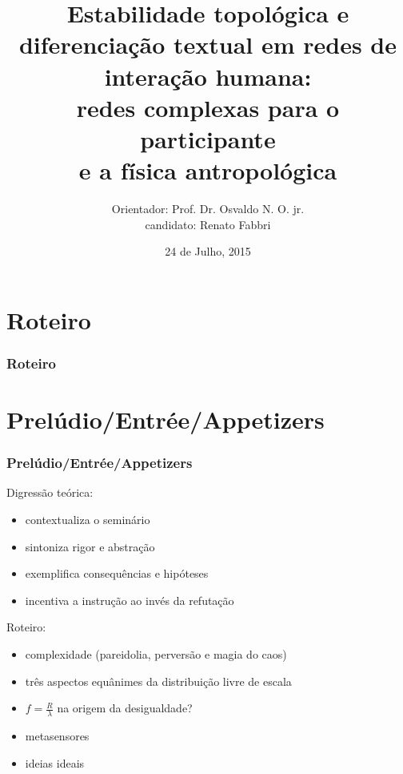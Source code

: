 \documentclass[10pt]{beamer}
\begin{document}
\title {\bfseries{\sc\large Estabilidade topológica e diferenciação textual
em redes de interação humana: \\
redes complexas para o participante\\
e a física antropológica
}}


\author[Renato Fabbri]{\small {Orientador: Prof. Dr. Osvaldo N. O. jr.\\
		candidato: Renato Fabbri\\
}}

\date{\small 24 de Julho, 2015} 
\begin{frame}
\titlepage
\end{frame}
\section*{Roteiro}
\begin{frame}
\frametitle{Roteiro}  
\tableofcontents
\end{frame}

\section{Prelúdio/Entrée/Appetizers}
\begin{frame}
\frametitle{Prelúdio/Entrée/Appetizers}


Digressão teórica:
\begin{itemize}
	\item contextualiza o seminário
	\item sintoniza rigor e abstração
	\item exemplifica consequências e hipóteses
	\item incentiva a instrução ao invés da refutação
\end{itemize}

\vspace{.7cm}

Roteiro:
\begin{itemize}
	\item complexidade (pareidolia, perversão e magia do caos)
	\item três aspectos equânimes da distribuição livre de escala
	\item $f=\frac{R}{\lambda}$ na origem da desigualdade?
	\item metasensores
	\item ideias ideais
\end{itemize}
\end{frame}
\end{document}
